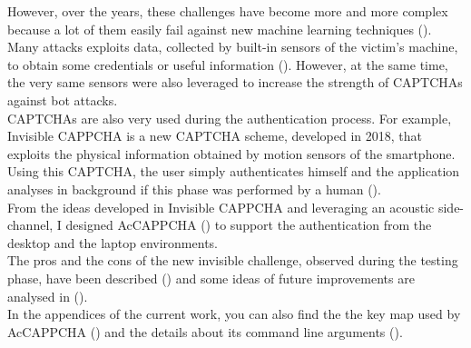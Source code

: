 However, over the years, these challenges have become more and more complex because a lot of them easily fail against new machine learning techniques ().\\
Many attacks exploits data, collected by built-in sensors of the victim's machine, to obtain some credentials or useful information (). However, at the same time, the very same sensors were also leveraged to increase the strength of CAPTCHAs against bot attacks.\\
CAPTCHAs are also very used during the authentication process. For example, Invisible CAPPCHA is a new CAPTCHA scheme, developed in 2018, that exploits the physical information obtained by motion sensors of the smartphone\cite{Invisible_CAPPCHA}. Using this CAPTCHA, the user simply authenticates himself and the application analyses in background if this phase was performed by a human ().\\
From the ideas developed in Invisible CAPPCHA and leveraging an acoustic side-channel, I designed AcCAPPCHA () to support the authentication from the desktop and the laptop environments.\\
The pros and the cons of the new invisible challenge, observed during the testing phase, have been described () and some ideas of future improvements are analysed in ().\\
In the appendices of the current work, you can also find the the key map used by AcCAPPCHA () and the details about its command line arguments ().
